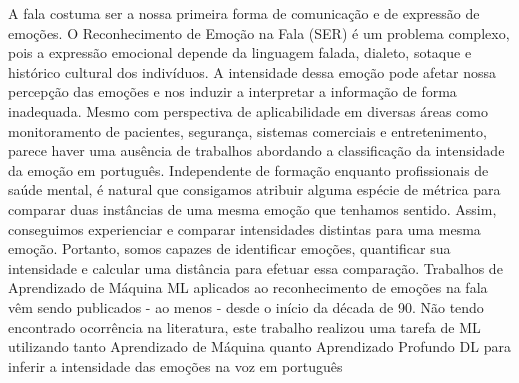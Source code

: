 A fala costuma ser a nossa primeira forma de comunicação e de expressão de emoções. O Reconhecimento de Emoção na Fala (\acrfull{SER}) é um problema complexo, pois a expressão emocional depende da linguagem falada, dialeto, sotaque e histórico cultural dos indivíduos. A intensidade dessa emoção pode afetar nossa percepção das emoções e nos induzir a interpretar a informação de forma inadequada. Mesmo com perspectiva de aplicabilidade em diversas áreas como monitoramento de pacientes, segurança, sistemas comerciais e entretenimento, parece haver uma ausência de trabalhos abordando a classificação da intensidade da emoção em português. Independente de formação enquanto profissionais de saúde mental, é natural que consigamos atribuir alguma espécie de métrica para comparar duas instâncias de uma mesma emoção que tenhamos sentido. Assim, conseguimos experienciar e comparar intensidades distintas para uma mesma emoção. Portanto, somos capazes de identificar emoções, quantificar sua intensidade e calcular uma distância para efetuar essa comparação. Trabalhos de Aprendizado de Máquina \acrfull{ML} aplicados ao reconhecimento de emoções na fala vêm sendo publicados - ao menos - desde o início da década de 90. Não tendo encontrado ocorrência na literatura, este trabalho realizou uma tarefa de \acrshort{ML} utilizando tanto Aprendizado de Máquina quanto Aprendizado Profundo \acrfull{DL} para inferir a intensidade das emoções na voz em português